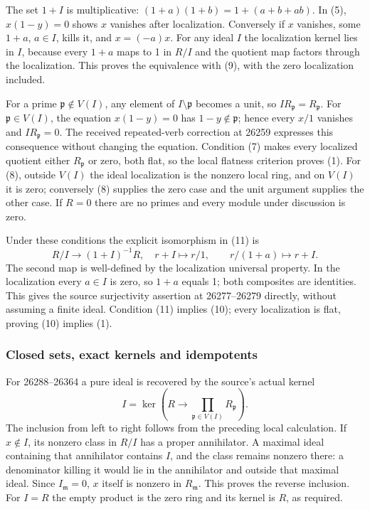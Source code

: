 The set \(1+I\) is multiplicative: \((1+a)(1+b)=1+(a+b+ab)\). In (5), \(x(1-y)=0\) shows \(x\) vanishes after localization. Conversely if \(x\) vanishes, some \(1+a\), \(a\in I\), kills it, and \(x=(-a)x\). For any ideal \(I\) the localization kernel lies in \(I\), because every \(1+a\) maps to 1 in \(R/I\) and the quotient map factors through the localization. This proves the equivalence with (9), with the zero localization included.

For a prime \(\mathfrak p\notin V(I)\), any element of \(I\setminus\mathfrak p\) becomes a unit, so \(IR_{\mathfrak p}=R_{\mathfrak p}\). For \(\mathfrak p\in V(I)\), the equation \(x(1-y)=0\) has \(1-y\notin\mathfrak p\); hence every \(x/1\) vanishes and \(IR_{\mathfrak p}=0\). The received repeated-verb correction at 26259 expresses this consequence without changing the equation. Condition (7) makes every localized quotient either \(R_{\mathfrak p}\) or zero, both flat, so the local flatness criterion proves (1). For (8), outside \(V(I)\) the ideal localization is the nonzero local ring, and on \(V(I)\) it is zero; conversely (8) supplies the zero case and the unit argument supplies the other case. If \(R=0\) there are no primes and every module under discussion is zero.

Under these conditions the explicit isomorphism in (11) is \[
R/I\longrightarrow(1+I)^{-1}R,\quad r+I\mapsto r/1,
\qquad r/(1+a)\longmapsto r+I .
\] The second map is well-defined by the localization universal property. In the localization every \(a\in I\) is zero, so \(1+a\) equals 1; both composites are identities. This gives the source surjectivity assertion at 26277--26279 directly, without assuming a finite ideal. Condition (11) implies (10); every localization is flat, proving (10) implies (1).

\subsubsection{Closed sets, exact kernels and idempotents}\label{closed-sets-exact-kernels-and-idempotents}

For 26288--26364 a pure ideal is recovered by the source's actual kernel \[
I=\ker\left(R\longrightarrow\prod_{\mathfrak p\in V(I)}R_{\mathfrak p}\right).
\] The inclusion from left to right follows from the preceding local calculation. If \(x\notin I\), its nonzero class in \(R/I\) has a proper annihilator. A maximal ideal containing that annihilator contains \(I\), and the class remains nonzero there: a denominator killing it would lie in the annihilator and outside that maximal ideal. Since \(I_{\mathfrak m}=0\), \(x\) itself is nonzero in \(R_{\mathfrak m}\). This proves the reverse inclusion. For \(I=R\) the empty product is the zero ring and its kernel is \(R\), as required.

